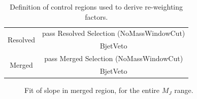 \begin{table}[ht]
    \centering
    \begin{tabular}{|c|c|}
        \hline
        \multirow{2}{4em}{Resolved} & pass Resolved Selection (NoMassWindowCut)  \\
         & BjetVeto  \\
         \hline
        \multirow{2}{4em}{Merged} &  pass Merged Selection (NoMassWindowCut) \\
        & BjetVeto  \\
         \hline
    \end{tabular}
    \caption{Definition of control regions used to derive \Wjets re-weighting factors.}
    \label{tab:mjjReweight1LepRegions}
\end{table}

\begin{figure}[ht]
    \centering
    \caption{Fit of \mjjtag slope in merged region, for the entire $M_J$ range. }
    \label{fig:mjjReweight1LepMer}
\end{figure}


